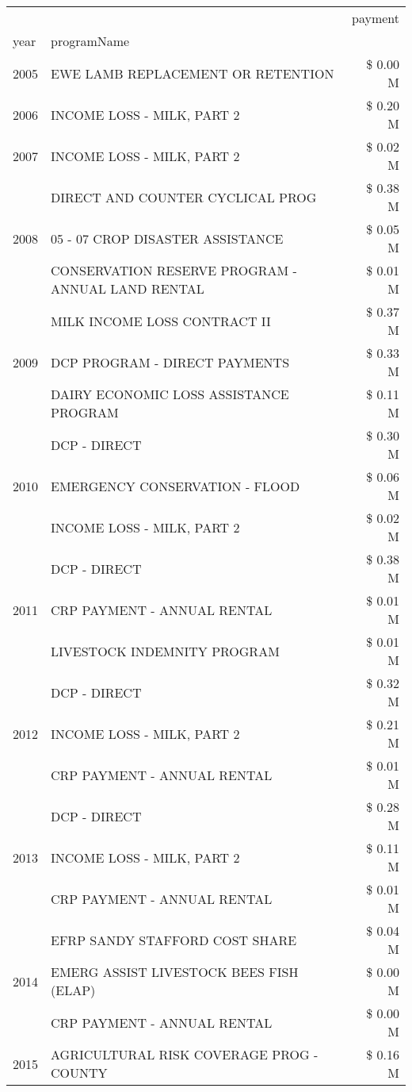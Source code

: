 \begin{tabular}{llr}
\toprule
 &  & payment \\
year & programName &  \\
\midrule
2005 & EWE LAMB REPLACEMENT OR RETENTION & \$ 0.00 M \\
\cline{1-3}
2006 & INCOME LOSS - MILK, PART 2 & \$ 0.20 M \\
\cline{1-3}
2007 & INCOME LOSS - MILK, PART 2 & \$ 0.02 M \\
\cline{1-3}
\multirow[t]{3}{*}{2008} & DIRECT AND COUNTER CYCLICAL PROG & \$ 0.38 M \\
 & 05 - 07 CROP DISASTER ASSISTANCE & \$ 0.05 M \\
 & CONSERVATION RESERVE PROGRAM - ANNUAL LAND RENTAL & \$ 0.01 M \\
\cline{1-3}
\multirow[t]{3}{*}{2009} & MILK INCOME LOSS CONTRACT II & \$ 0.37 M \\
 & DCP PROGRAM - DIRECT PAYMENTS & \$ 0.33 M \\
 & DAIRY ECONOMIC LOSS ASSISTANCE PROGRAM & \$ 0.11 M \\
\cline{1-3}
\multirow[t]{3}{*}{2010} & DCP - DIRECT & \$ 0.30 M \\
 & EMERGENCY CONSERVATION - FLOOD & \$ 0.06 M \\
 & INCOME LOSS - MILK, PART 2 & \$ 0.02 M \\
\cline{1-3}
\multirow[t]{3}{*}{2011} & DCP - DIRECT & \$ 0.38 M \\
 & CRP PAYMENT - ANNUAL RENTAL & \$ 0.01 M \\
 & LIVESTOCK INDEMNITY PROGRAM & \$ 0.01 M \\
\cline{1-3}
\multirow[t]{3}{*}{2012} & DCP - DIRECT & \$ 0.32 M \\
 & INCOME LOSS - MILK, PART 2 & \$ 0.21 M \\
 & CRP PAYMENT - ANNUAL RENTAL & \$ 0.01 M \\
\cline{1-3}
\multirow[t]{3}{*}{2013} & DCP - DIRECT & \$ 0.28 M \\
 & INCOME LOSS - MILK, PART 2 & \$ 0.11 M \\
 & CRP PAYMENT - ANNUAL RENTAL & \$ 0.01 M \\
\cline{1-3}
\multirow[t]{3}{*}{2014} & EFRP SANDY STAFFORD COST SHARE & \$ 0.04 M \\
 & EMERG ASSIST LIVESTOCK BEES FISH (ELAP) & \$ 0.00 M \\
 & CRP PAYMENT - ANNUAL RENTAL & \$ 0.00 M \\
\cline{1-3}
\multirow[t]{3}{*}{2015} & AGRICULTURAL RISK COVERAGE PROG - COUNTY & \$ 0.16 M \\

\end{tabular}

